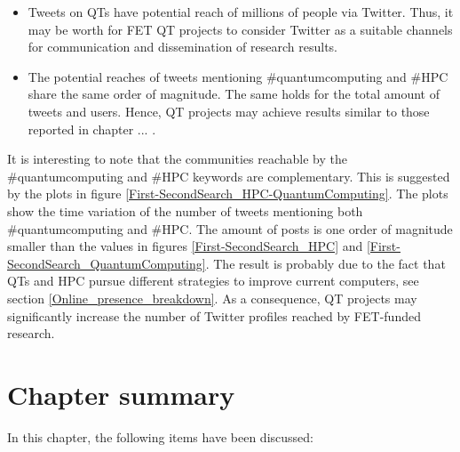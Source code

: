 \begin{itemize}
 \item Tweets on QTs have potential reach of millions of people via Twitter. Thus, it may be worth for FET QT projects to consider Twitter as a suitable channels for communication and dissemination of research results.
 \item The potential reaches of tweets mentioning \#quantumcomputing and \#HPC share the same order of magnitude. The same holds for the total amount of tweets and users. Hence, QT projects may achieve results similar to those reported in chapter ... . 
\end{itemize}

It is interesting to note that the communities reachable by the \#quantumcomputing and \#HPC keywords are complementary. This is suggested by the plots in figure \ref{First-SecondSearch_HPC-QuantumComputing}. The plots show the time variation of the number of tweets mentioning both \#quantumcomputing and \#HPC. The amount of posts is one order of magnitude smaller than the values in figures \ref{First-SecondSearch_HPC} and \ref{First-SecondSearch_QuantumComputing}. The result is probably due to the fact that QTs and HPC pursue different strategies to improve current computers, see section \ref{Online_presence_breakdown}. As a consequence, QT projects may significantly increase the number of Twitter profiles reached by FET-funded research.

\section{Chapter summary} 
In this chapter, the following items have been discussed: 

